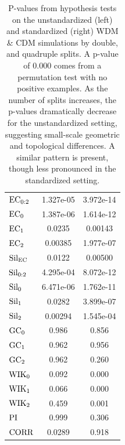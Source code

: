 \documentclass[12pt]{article}
\begin{document}
\begin{table}[htp!]
\begin{center}
\begin{tabular}{ l | c |  c }
          $\textup{EC}_{0:2}$ & 1.327e-05 &  3.972e-14 \\
          $\textup{EC}_{0}$ & 1.387e-06 & 1.614e-12 \\
          $\textup{EC}_{1}$ & 0.0235 & 0.00143 \\
          $\textup{EC}_{2}$ & 0.00385 & 1.977e-07 \\
          \midrule
          $\textup{Sil}_{\textup{EC}}$ & 0.0122 & 0.00500 \\
          $\textup{Sil}_{0:2}$ & 4.295e-04 & 8.072e-12 \\
          $\textup{Sil}_{0}$ & 6.471e-06 & 1.762e-11 \\
          $\textup{Sil}_{1}$ & 0.0282 & 3.899e-07 \\
          $\textup{Sil}_{2}$ & 0.00294 & 1.545e-04 \\
          \midrule
          $\textup{GC}_{0}$ & 0.986 & 0.856 \\
          $\textup{GC}_{1}$ & 0.962 & 0.956 \\
          $\textup{GC}_{2}$ & 0.962 & 0.260 \\
          \midrule
          $\textup{WIK}_{0}$ & 0.092 & 0.000 \\
          $\textup{WIK}_{1}$ & 0.066 & 0.000 \\
          $\textup{WIK}_{2}$ & 0.459 & 0.001 \\
          $\textup{PI}$ & 0.999 & 0.306 \\
          \midrule
          $\textup{CORR}$ & 0.0289 & 0.918 \\
          \bottomrule
        \end{tabular}
    \end{center}
\caption{P-values from hypothesis tests on the unstandardized (left) and standardized (right) WDM \& CDM simulations by double, and quadruple splits. A p-value of $0.000$ comes from a permutation test with no positive examples. As the number of splits increases, the p-values dramatically decrease for the unstandardized setting, suggesting small-scale geometric and topological differences. A similar pattern is present, though less pronounced in the standardized setting.}
\label{table:hypoCDMWDMresults}
\end{table}
\end{document}
